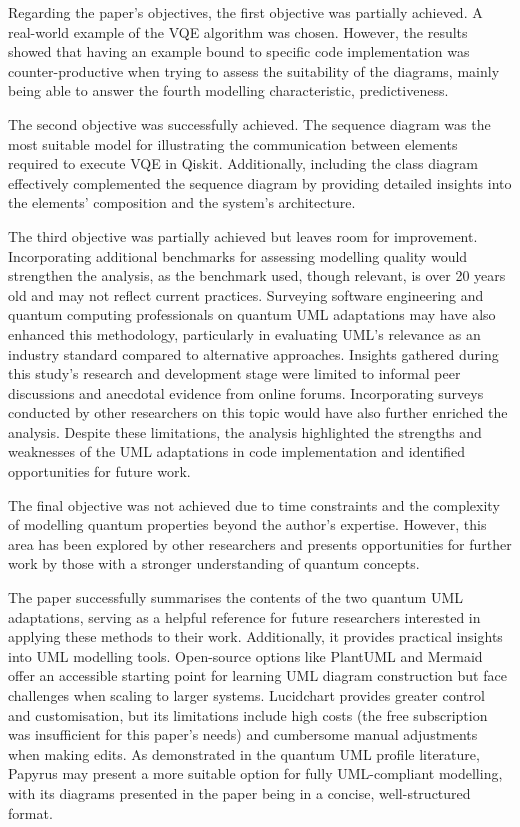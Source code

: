 \documentclass{article}
\begin{document}
Regarding the paper's objectives, the first objective was partially achieved. A real-world example of the VQE algorithm was chosen. However, the results showed that having an example bound to specific code implementation was counter-productive when trying to assess the suitability of the diagrams, mainly being able to answer the fourth modelling characteristic, predictiveness.

The second objective was successfully achieved. The sequence diagram was the most suitable model for illustrating the communication between elements required to execute VQE in Qiskit. Additionally, including the class diagram effectively complemented the sequence diagram by providing detailed insights into the elements' composition and the system's architecture.

The third objective was partially achieved but leaves room for improvement. Incorporating additional benchmarks for assessing modelling quality would strengthen the analysis, as the benchmark used, though relevant, is over 20 years old and may not reflect current practices. Surveying software engineering and quantum computing professionals on quantum UML adaptations may have also enhanced this methodology, particularly in evaluating UML's relevance as an industry standard compared to alternative approaches. Insights gathered during this study's research and development stage were limited to informal peer discussions and anecdotal evidence from online forums\cite{redditumloften}. Incorporating surveys conducted by other researchers on this topic would have also further enriched the analysis\cite{jimenez2024quantum}. Despite these limitations, the analysis highlighted the strengths and weaknesses of the UML adaptations in code implementation and identified opportunities for future work.

The final objective was not achieved due to time constraints and the complexity of modelling quantum properties beyond the author’s expertise. However, this area has been explored by other researchers and presents opportunities for further work by those with a stronger understanding of quantum concepts\cite{10.1145/3412451.3428499}.

The paper successfully summarises the contents of the two quantum UML adaptations, serving as a helpful reference for future researchers interested in applying these methods to their work. Additionally, it provides practical insights into UML modelling tools. Open-source options like PlantUML and Mermaid offer an accessible starting point for learning UML diagram construction but face challenges when scaling to larger systems. Lucidchart provides greater control and customisation, but its limitations include high costs (the free subscription was insufficient for this paper’s needs) and cumbersome manual adjustments when making edits. As demonstrated in the quantum UML profile literature, Papyrus may present a more suitable option for fully UML-compliant modelling, with its diagrams presented in the paper being in a concise, well-structured format.
\end{document}
